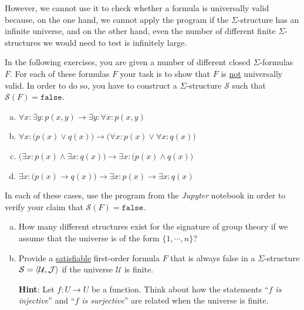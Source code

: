 However, we cannot use it to check whether a formula is universally valid because, on the one hand, we cannot apply
the program if the $\Sigma$-structure has an infinite universe, and on the other hand, even the number of
different finite $\Sigma$-structures we would need to test is infinitely large. \eox 

\exerciseEng
In the following exercises, you are given a number of different closed $\Sigma$-formulas $F$. For each of these
formulas $F$ your task is to show that $F$ is \underline{not} universally valid.  In order to do so,
you have to construct a $\Sigma$-structure $\mathcal{S}$ such that $\mathcal{S}(F) = \mathtt{false}$.
\begin{enumerate}[(a)]
\item $\forall x: \exists y: p(x,y) \rightarrow \exists y: \forall x: p(x,y)$
\item $\forall x: \bigl(p(x) \lor q(x)\bigr) \rightarrow \bigl(\forall x: p(x) \lor \forall x: q(x)\bigr)$
\item $\bigl(\exists x: p(x) \land \exists x: q(x)\bigr) \rightarrow \exists x: \bigl(p(x) \land q(x)\bigr)$
\item $\exists x: \bigl(p(x) \rightarrow q(x)\bigr) \rightarrow \exists x: p(x) \rightarrow \exists x: q(x)$
\end{enumerate}
In each of these cases, use the program from the \textsl{Jupyter} notebook
\href{https://github.com/karlstroetmann/Logic/blob/master/Java/Chapter-5/01-FOL-Evaluation.ipynb}{}
in order to verify your claim that $\mathcal{S}(F) = \mathtt{false}$.

\exerciseEng
\begin{enumerate}[(a)]
\item How many different structures exist for the signature of group theory if we assume that the
      universe is of the form $\{1, \cdots, n\}$?
\item Provide a \underline{satisfiable} first-order formula $F$ that is always false in a 
      $\Sigma$-structure $\mathcal{S} = \pair(\mathcal{U},\mathcal{J})$ if  the universe $\mathcal{U}$ is finite.

      \textbf{Hint}: Let $f: U \rightarrow U$ be a function. Think about how the statements
      ``\emph{$f$ is injective}'' and ``\emph{$f$ is surjective}'' are related when the universe is finite.
      \exend  
\end{enumerate}

